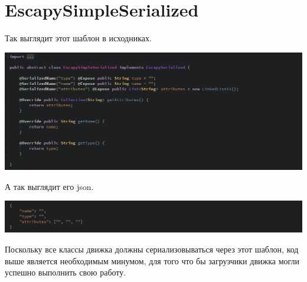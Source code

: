 \documentclass[11pt]{report}
\begin{document}
\section{EscapySimpleSerialized}
Так выглядит этот шаблон в исходниках.
\begin{center}
	\includegraphics[width=1.2\linewidth]{img/5.png} 
  	\label{img:5} 
\end{center}	
А так выглядит его json.	
\begin{center}
	\includegraphics[width=1.2\linewidth]{img/6.png} 
  	\label{img:6} 
\end{center}
Поскольку все классы движка должны сериализовываться через этот шаблон, код выше является необходимым минумом, для того что бы загрузчики движка могли успешно выполнить свою работу.
\newpage
\end{document}
